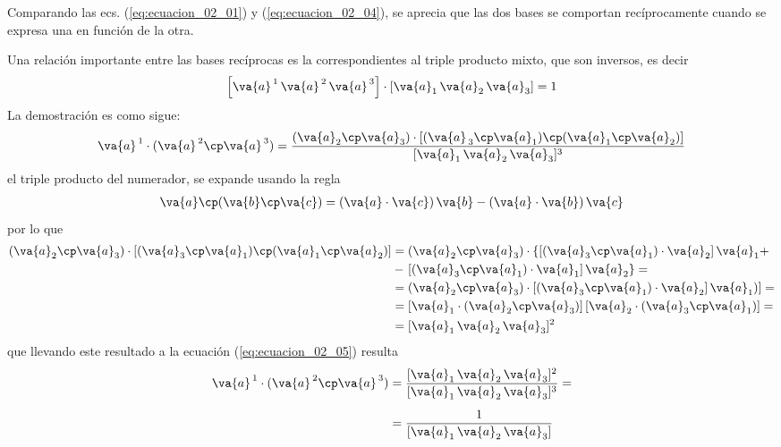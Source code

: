 Comparando las ecs. (\ref{eq:ecuacion_02_01}) y (\ref{eq:ecuacion_02_04}), se aprecia que las dos bases se comportan recíprocamente cuando se expresa una en función de la otra.
\par
Una relación importante entre las bases recíprocas es la correspondientes al triple producto mixto, que son inversos, es decir
\begin{align*}
\left[ \va{a}^{\, 1} \, \va{a}^{\, 2} \, \va{a}^{\, 3} \right] \cdot \left[ \va{a}_{1} \, \va{a}_{2} \, \va{a}_{3} \right]
= 1
\end{align*}
La demostración es como sigue:
\begin{align}
\va{a}^{\, 1} \cdot (\va{a}^{\, 2} \cp \va{a}^{\, 3}) = \dfrac{(\va{a}_{2} \cp \va{a}_{3}) \cdot [(\va{a}_{\, 3} \cp \va{a}_{1}) \cp (\va{a}_{1} \cp \va{a}_{2})]}{[ \va{a}_{1} \, \va{a}_{2} \, \va{a}_{3}]^{3}}
\label{eq:ecuacion_02_05}
\end{align}
el triple producto del numerador, se expande usando la regla
\begin{align*}
\va{a} \cp (\va{b} \cp \va{c}) = (\va{a} \cdot \va{c}) \, \va{b} - (\va{a} \cdot \va{b}) \, \va{c}
\end{align*}
por lo que
\begin{align*}
(\va{a}_{2} \cp \va{a}_{3}) \cdot [(\va{a}_{3} \cp \va{a}_{1}) \cp (\va{a}_{1} \cp \va{a}_{2})] &= (\va{a}_{2} \cp \va{a}_{3}) \cdot \left\{ [(\va{a}_{3} \cp \va{a}_{1}) \cdot \va{a}_{2}] \, \va{a}_{1} + \right. \\
&- \left. [(\va{a}_{3} \cp \va{a}_{1}) \cdot \va{a}_{1}] \, \va{a}_{2} \right\} = \\
&= (\va{a}_{2} \cp \va{a}_{3}) \cdot [(\va{a}_{3} \cp \va{a}_{1}) \cdot \va{a}_{2} ] \, \va{a}_{1})] = \\
&= [\va{a}_{1} \cdot (\va{a}_{2} \cp \va{a}_{3})] \, [\va{a}_{2} \cdot (\va{a}_{3} \cp \va{a}_{1})] = \\
&= [ \va{a}_{1} \, \va{a}_{2} \, \va{a}_{3}]^{2}
\end{align*}
que llevando este resultado a la ecuación (\ref{eq:ecuacion_02_05}) resulta
\begin{align*}
\va{a}^{\, 1} \cdot (\va{a}^{\, 2} \cp \va{a}^{\, 3}) &= \dfrac{[ \va{a}_{1} \, \va{a}_{2} \, \va{a}_{3}]^{2}}{[ \va{a}_{1} \, \va{a}_{2} \, \va{a}_{3}]^{3}} = \\[0.5em]
&= \dfrac{1}{[ \va{a}_{1} \, \va{a}_{2} \, \va{a}_{3}]}
\end{align*}
